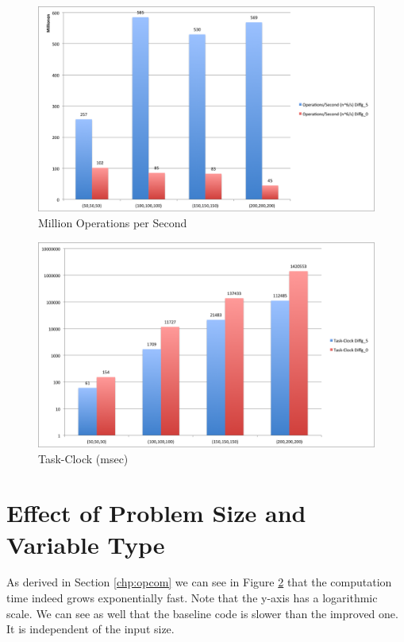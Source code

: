 \documentclass[12pt,a4paper]{article}
\begin{document}
\begin{figure}[h]
	\centering
	\includegraphics[width=1.0\linewidth]{"Benchmark 2/oper"}
	\caption{Million Operations per Second}
	\label{fig:oper}
\end{figure}
\begin{figure}[h]
	\centering
	\includegraphics[width=1.0\linewidth]{"Benchmark 2/clock"}
	\caption{Task-Clock (msec)}
	\label{fig:clock}
\end{figure}


\section{Effect of Problem Size and Variable Type}

As derived in Section \ref{chp:opcom} we can see in Figure \ref{fig:clock} that the computation time indeed grows exponentially fast. Note that the y-axis has a logarithmic scale. We can see as well that the baseline code is slower than the improved one. It is independent of the input size.
\end{document}
